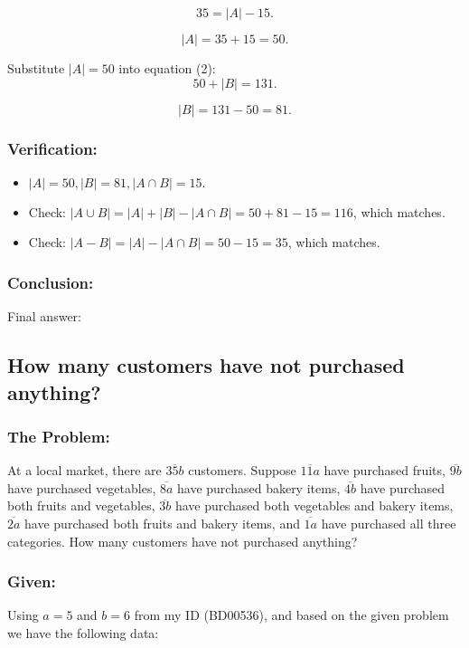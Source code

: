 \documentclass[12pt, a4paper, twoside]{report} %
\begin{document}
  \[
  35 = |A| - 15.
  \]

  \[
  |A| = 35 + 15 = 50.
  \]

  Substitute \( |A| = 50 \) into equation (2):
  \[
  50 + |B| = 131.
  \]

  \[
  |B| = 131 - 50 = 81.
  \]

\subsubsection*{Verification:}
  \begin{itemize}
    \item $|A|=50, |B|=81,|A\cap B|=15.$
    \item Check: $|A \cup B| = |A| + |B| - |A \cap B| = 50 + 81 - 15 = 116$, which matches.
    \item Check: $|A - B| = |A| - |A \cap B| = 50 - 15 = 35$, which matches.
  \end{itemize}

\subsubsection*{Conclusion:}
Final answer: 

\subsection{How many customers have not purchased anything?}

\subsubsection*{The Problem:}
At a local market, there are $\overline {35b}$ customers. Suppose $\overline {11a}$ have purchased fruits, $\overline {9b}$ have purchased vegetables, $\overline {8a}$ have purchased bakery items, $\overline{4b}$ have purchased both fruits and vegetables, $\overline{3b}$ have purchased both vegetables and bakery items, $\overline{2a}$ have purchased both fruits and bakery items, and $\overline{1a}$ have purchased all three categories. How many customers have not purchased anything?
\subsubsection*{Given:}
  Using \(a = 5\) and \(b = 6\) from my ID (BD00536), and based on the given problem we have the following data:
\end{document}
